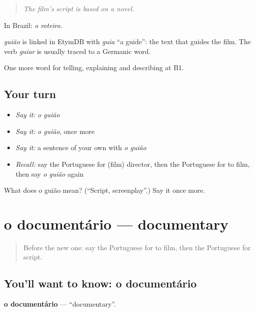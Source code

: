 \begin{quote}
\emph{The film's script is based on a novel.}
\end{quote}

In Brazil: \emph{o roteiro}.

\begin{cousinweb}
\emph{guião} is linked in EtymDB with \emph{guia} \textquotedblleft{}a guide\textquotedblright{}: the text that guides the film. The verb \emph{guiar} is usually traced to a Germanic word.
\end{cousinweb}

\begin{grammarlens}[title={What you've built}]
One more word for telling, explaining and describing at B1.
\end{grammarlens}

\subsection*{Your turn}
\begin{itemize}
\raggedright
  \item \emph{Say it:} \emph{o guião}
  \item \emph{Say it:} \emph{o guião}, once more
  \item \emph{Say it:} a sentence of your own with \emph{o guião}
  \item \emph{Recall:} say the Portuguese for (film) director, then the Portuguese for to film, then say \emph{o guião} again
\end{itemize}

\begin{tcolorbox}[breakable,colback=teal!4,colframe=teal!35!black,title={Before you move on}]
What does o guião mean? (\textquotedblleft{}Script, screenplay\textquotedblright{}.) Say it once more.
\end{tcolorbox}
\section[o documentário]{o documentário — documentary}

\label{lesson:PT-C527-documentario}



\begin{quote}
Before the new one: say the Portuguese for to film, then the Portuguese for script.
\end{quote}

\subsection*{You'll want to know: o documentário}
\textbf{o documentário} — \textquotedblleft{}documentary\textquotedblright{}.

